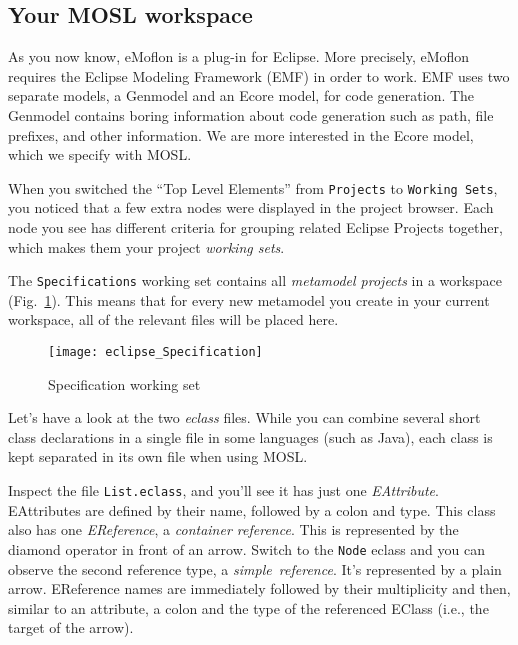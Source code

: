 \newpage
\texHeader
\hypertarget{projectStructure tex}{}
\subsection{Your MOSL workspace}

As you now know, eMoflon is a plug-in for Eclipse. More precisely, eMoflon requires the Eclipse Modeling Framework (EMF) in order to work. EMF uses two separate
models, a Genmodel and an Ecore model, for code generation. The Genmodel contains boring information about code generation such as path, file prefixes, and
other information. We are more interested in the Ecore model, which we specify with MOSL.

When you switched the ``Top Level Elements'' from \texttt{Projects} to \texttt{Working Sets}, you noticed that a few extra nodes were displayed in the project
browser. Each node you see has different criteria for grouping related Eclipse Projects together, which makes them your project \emph{working sets}.

The \texttt{Specifications} working set contains all \emph{metamodel projects} in a workspace (Fig.~\ref{fig_modelSpecification}). This means that for every
new metamodel you create in your current workspace, all of the relevant files will be placed here.

 \begin{figure}[htbp]
  \centering
  \texttt{[image: eclipse\_Specification]}
  \caption{Specification working set}
  \label{fig_modelSpecification}
\end{figure}
  
Let's have a look at the two \emph{eclass} files. While you can combine several short class declarations in a single file in some languages (such as Java),
each class is kept separated in its own file when using MOSL.

Inspect the file \texttt{List.eclass}, and you'll see it has just one \emph{EAttribute}. EAttributes are defined by their name, followed by a colon and type.
This class also has one \emph{EReference}, a \emph{container reference}. This is represented by the diamond operator in front of an arrow.
Switch to the \texttt{Node} eclass and you can observe the second reference type, a \emph{simple~reference}. It's represented by a plain arrow. EReference names are
immediately followed by their multiplicity and then, similar to an attribute, a colon and the type of the referenced EClass (i.e., the target of the arrow).

